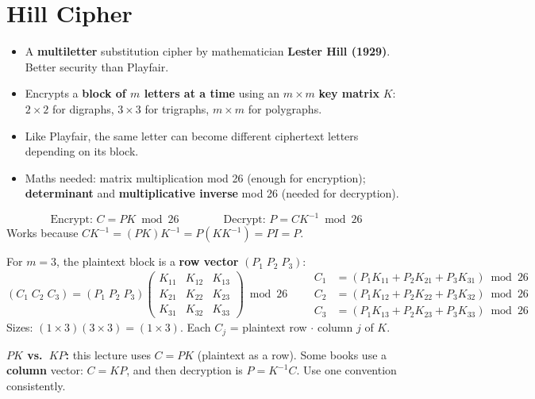 \section{Hill Cipher}

\begin{itemize}
  \item A \textbf{multiletter} substitution cipher by mathematician \textbf{Lester Hill (1929)}. Better security than Playfair.
  \item Encrypts a \textbf{block of $m$ letters at a time} using an $m\times m$ \textbf{key matrix} $K$: $2\times2$ for digraphs, $3\times3$ for trigraphs, $m\times m$ for polygraphs.
  \item Like Playfair, the same letter can become different ciphertext letters depending on its block.
  \item Maths needed: matrix multiplication mod 26 (enough for encryption); \textbf{determinant} and \textbf{multiplicative inverse} mod 26 (needed for decryption).
\end{itemize}

\begin{keybox}[title=Hill cipher]
\vspace{-6pt}
\[
\text{Encrypt: } C = PK \bmod 26 \qquad\qquad \text{Decrypt: } P = CK^{-1} \bmod 26
\]
Works because $CK^{-1} = (PK)K^{-1} = P(KK^{-1}) = PI = P$.
\end{keybox}

For $m = 3$, the plaintext block is a \textbf{row vector} $(P_1\;P_2\;P_3)$:
\[
(C_1\;C_2\;C_3) = (P_1\;P_2\;P_3)\begin{pmatrix}K_{11}&K_{12}&K_{13}\\K_{21}&K_{22}&K_{23}\\K_{31}&K_{32}&K_{33}\end{pmatrix} \bmod 26
\qquad
\begin{aligned}
C_1 &= (P_1K_{11}+P_2K_{21}+P_3K_{31}) \bmod 26\\
C_2 &= (P_1K_{12}+P_2K_{22}+P_3K_{32}) \bmod 26\\
C_3 &= (P_1K_{13}+P_2K_{23}+P_3K_{33}) \bmod 26
\end{aligned}
\]
Sizes: $(1\times3)(3\times3) = (1\times3)$. Each $C_j$ = plaintext row $\cdot$ column $j$ of $K$.

\textbf{$PK$ vs.\ $KP$:} this lecture uses $C = PK$ (plaintext as a row). Some books use a \textbf{column} vector: $C = KP$, and then decryption is $P = K^{-1}C$. Use one convention consistently.

